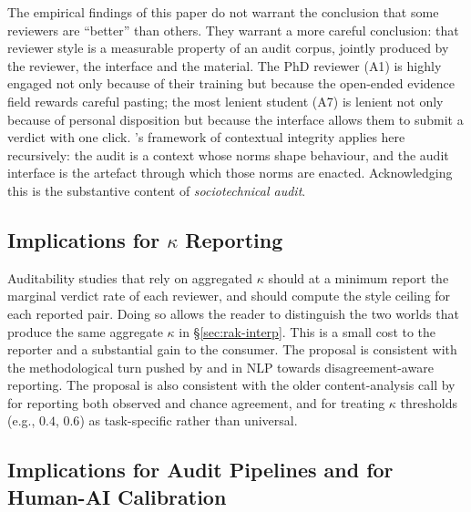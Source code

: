 \documentclass[11pt,a4paper]{article}
\newcommand{\Acc}[1]{\textsf{A#1}}
\begin{document}
The empirical findings of this paper do not warrant the conclusion
that some reviewers are ``better'' than others. They warrant a
more careful conclusion: that reviewer style is a measurable property
of an audit corpus, jointly produced by the reviewer, the interface
and the material. The PhD reviewer (\Acc{1}) is highly engaged not
only because of their training but because the open-ended evidence
field rewards careful pasting; the most lenient student (\Acc{7})
is lenient not only because of personal disposition but because the
interface allows them to submit a verdict with one click.
\citet{nissenbaum2004privacy}'s framework of contextual integrity
applies here recursively: the audit is a context whose norms shape
behaviour, and the audit interface is the artefact through which
those norms are enacted. Acknowledging this is the substantive
content of \emph{sociotechnical audit}.

\subsection{Implications for $\kappa$ Reporting}
\label{sec:disc-kappa}

Auditability studies that rely on aggregated $\kappa$ should at a
minimum report the marginal verdict rate of each reviewer, and
should compute the style ceiling for each reported pair. Doing so
allows the reader to distinguish the two worlds that produce the
same aggregate $\kappa$ in \S\ref{sec:rak-interp}. This is a small
cost to the reporter and a substantial gain to the consumer. The
proposal is consistent with the methodological turn pushed by
\citet{aroyo2015truth} and \citet{plank2022problem} in NLP towards
disagreement-aware reporting. The proposal is also consistent with
the older content-analysis call by \citet{artstein2008intercoder}
for reporting both observed and chance agreement, and for treating
$\kappa$ thresholds (e.g., $0.4$, $0.6$) as task-specific rather than
universal.

\subsection{Implications for Audit Pipelines and for Human-AI Calibration}
\label{sec:disc-pipeline}
\end{document}
